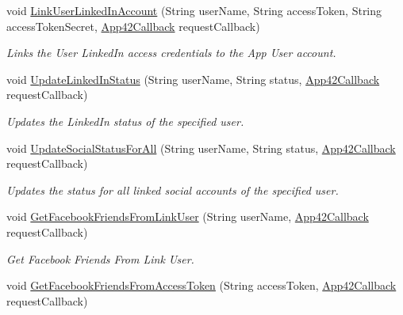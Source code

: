 \begin{DoxyCompactItemize}
void \hyperlink{classcom_1_1shephertz_1_1app42_1_1paas_1_1sdk_1_1windows_1_1social_1_1_social_service_af83b65d6884768b332cdf3388a1150f9}{Link\+User\+Linked\+In\+Account} (String user\+Name, String access\+Token, String access\+Token\+Secret, \hyperlink{interfacecom_1_1shephertz_1_1app42_1_1paas_1_1sdk_1_1windows_1_1_app42_callback}{App42\+Callback} request\+Callback)
\begin{DoxyCompactList}\small\item\em Links the User Linked\+In access credentials to the App User account. \end{DoxyCompactList}\item 
void \hyperlink{classcom_1_1shephertz_1_1app42_1_1paas_1_1sdk_1_1windows_1_1social_1_1_social_service_ae68d4a76d21da4be088466ccc086aa5b}{Update\+Linked\+In\+Status} (String user\+Name, String status, \hyperlink{interfacecom_1_1shephertz_1_1app42_1_1paas_1_1sdk_1_1windows_1_1_app42_callback}{App42\+Callback} request\+Callback)
\begin{DoxyCompactList}\small\item\em Updates the Linked\+In status of the specified user. \end{DoxyCompactList}\item 
void \hyperlink{classcom_1_1shephertz_1_1app42_1_1paas_1_1sdk_1_1windows_1_1social_1_1_social_service_a56c79de1b4abde83fa2e7c83b05b6a94}{Update\+Social\+Status\+For\+All} (String user\+Name, String status, \hyperlink{interfacecom_1_1shephertz_1_1app42_1_1paas_1_1sdk_1_1windows_1_1_app42_callback}{App42\+Callback} request\+Callback)
\begin{DoxyCompactList}\small\item\em Updates the status for all linked social accounts of the specified user. \end{DoxyCompactList}\item 
void \hyperlink{classcom_1_1shephertz_1_1app42_1_1paas_1_1sdk_1_1windows_1_1social_1_1_social_service_a3810dd70538ee3b5e79109c6f5c49544}{Get\+Facebook\+Friends\+From\+Link\+User} (String user\+Name, \hyperlink{interfacecom_1_1shephertz_1_1app42_1_1paas_1_1sdk_1_1windows_1_1_app42_callback}{App42\+Callback} request\+Callback)
\begin{DoxyCompactList}\small\item\em Get Facebook Friends From Link User. \end{DoxyCompactList}\item 
void \hyperlink{classcom_1_1shephertz_1_1app42_1_1paas_1_1sdk_1_1windows_1_1social_1_1_social_service_a97c6c35001cf8ee0a3cdfda3eddd6444}{Get\+Facebook\+Friends\+From\+Access\+Token} (String access\+Token, \hyperlink{interfacecom_1_1shephertz_1_1app42_1_1paas_1_1sdk_1_1windows_1_1_app42_callback}{App42\+Callback} request\+Callback)

\end{DoxyCompactItemize}
